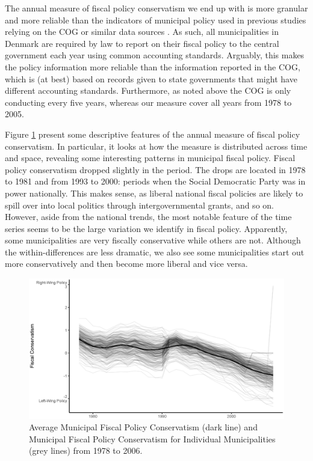 \documentclass[a4paper,12pt]{article}
\begin{document}
The annual measure of fiscal policy conservatism we end up with is more granular and more reliable than the indicators of municipal policy used in previous studies relying on the COG or similar data sources \citep{tausanovitch2014representation,palus2010responsiveness,sances2017voters,einstein2016pushing,hajnal2010or}. As such, all municipalities in Denmark are required by law to report on their fiscal policy to the central government each year using common accounting standards. Arguably, this makes the policy information more reliable than the information reported in the COG, which is (at best) based on records given to state governments that might have different accounting standards. Furthermore, as noted above the COG is only conducting every five years, whereas our measure cover all years from 1978 to 2005.

Figure \ref{fig:timeline} present some descriptive features of the annual measure of fiscal policy conservatism. In particular, it looks at how the measure is distributed across time and space, revealing some interesting patterns in municipal fiscal policy. Fiscal policy conservatism dropped slightly in the period. The drops are located in 1978 to 1981 and from 1993 to 2000: periods when the Social Democratic Party was in power nationally. This makes sense, as liberal national fiscal policies are likely to spill over into local politics through intergovernmental grants, and so on.  However, aside from the national trends, the most notable feature of the time series seems to be the large variation we identify in fiscal policy. Apparently, some municipalities are very fiscally conservative while others are not. Although the within-differences are less dramatic, we also see some municipalities start out more conservatively and then become more liberal and vice versa.

\begin{figure}[htbp]
	\centering 
	
	\includegraphics[width=1\textwidth]{fiscal_TimeSeries.eps}
	\caption{Average Municipal Fiscal Policy Conservatism (dark line) and Municipal Fiscal Policy Conservatism for Individual Municipalities (grey lines) from 1978 to 2006.}
	\label{fig:timeline}
	

	
\end{figure}
\end{document}
